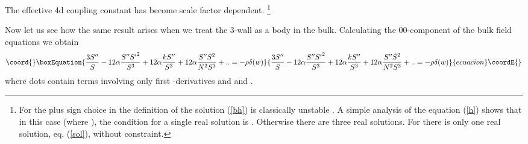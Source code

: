\documentclass[a4paper,a4paper]{article}
\begin{document}
The effective 4d coupling constant has become scale factor dependent.
\footnote{For the plus sign choice in the definition of \coordHE{} the solution (\ref{bh})
is classically unstable \coordHE{}. A simple analysis of the equation (\ref{h})
shows that in this case (where \coordHE{}), the condition for a single real
solution is \coordHE{}. Otherwise there are three real solutions.
 For \coordHE{}
there is only one real solution, eq. (\ref{sol}), without constraint.}

Now let us see how the same result arises when we treat the 3-wall as a body in the bulk. Calculating the
00-component of the bulk field equations we obtain
\begin{equation}\coord{}\boxEquation{
\frac{3S''}{S}-
12 \alpha \frac{ S'' {S'}^2}{S^3}+ 12 \alpha  \frac{k S''}{S^3}+
12 \alpha \frac{ S'' \dot S^2}{N^2S^3}+..=- \rho \delta(w)
}{
\frac{3S''}{S}-
12 \alpha \frac{ S'' {S'}^2}{S^3}+ 12 \alpha  \frac{k S''}{S^3}+
12 \alpha \frac{ S'' \dot S^2}{N^2S^3}+..=- \rho \delta(w)
}{ecuacion}\coordE{}\end{equation}
where dots contain terms involving only first 
\coordHE{}-derivatives and \coordHE{} and \coordHE{}. 
\end{document}
